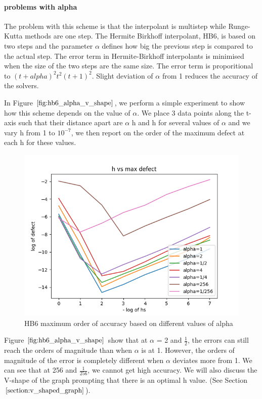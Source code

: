 \documentclass{article}
\begin{document}
\paragraph{problems with alpha}
The problem with this scheme is that the interpolant is multistep while Runge-Kutta methods are one step. The Hermite Birkhoff interpolant, HB6, is based on two steps and the parameter $\alpha$ defines how big the previous step is compared to the actual step. The error term in Hermite-Birkhoff interpolants is minimised when the size of the two steps are the same size. The error term is proporitional to $(t + alpha)^2t^2(t + 1)^2$. Slight deviation of $\alpha$ from 1 reduces the accuracy of the solvers.

In Figure $\ref{fig:hb6_alpha_v_shape}$, we perform a simple experiment to show how this scheme depends on the value of $\alpha$. We place 3 data points along the t-axis such that their distance apart are $\alpha$ h and h for several values of $\alpha$ and we vary h from 1 to $10^{-7}$, we then report on the order of the maximum defect at each h for these values.

\begin{figure}[H]
\centering
\includegraphics[width=0.7\linewidth]{./figures/hb6_alpha_v_shape}
\caption{HB6 maximum order of accuracy based on different values of alpha}
\label{fig:hb6_alpha_v_shape}
\end{figure}

Figure $\ref{fig:hb6_alpha_v_shape}$ show that at $\alpha$ = 2 and $\frac{1}{2}$, the errors can still reach the orders of magnitude than when $\alpha$ is at 1. However, the orders of magnitude of the error is completely different when $\alpha$ deviates more from 1. We can see that at 256 and $\frac{1}{256}$, we cannot get high accuracy. We will also discuss the V-shape of the graph prompting that there is an optimal h value. (See Section $\ref{section:v_shaped_graph}$).
\end{document}
